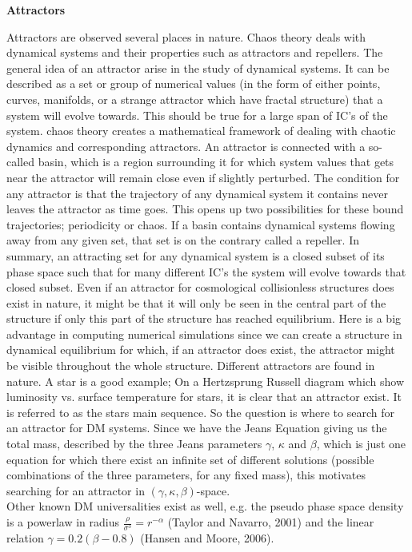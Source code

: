 \centerline{\textbf{Attractors}} 
Attractors are observed several places in nature. Chaos theory deals with dynamical systems and their properties such as attractors and repellers. The general idea of an attractor arise in the study of dynamical systems. It can be described as a set or group of numerical values (in the form of either points, curves, manifolds, or a strange attractor which have fractal structure) that a system will evolve towards. This should be true for a large span of IC's of the system. 
chaos theory creates a mathematical framework of dealing with chaotic dynamics and corresponding attractors. An attractor is connected with a so-called basin, which is a region surrounding it for which system values that gets near the attractor will remain close even if slightly perturbed. The condition for any attractor is that the trajectory of any dynamical system it contains never leaves the attractor as time goes. This opens up two possibilities for these bound trajectories; periodicity or chaos. If a basin contains dynamical systems flowing away from any given set, that set is on the contrary called a repeller. In summary, an attracting set for any dynamical system is a closed subset of its phase space such that for many different IC's the system will evolve towards that closed subset. Even if an attractor for cosmological collisionless structures does exist in nature, it might be that it will only be seen in the central part of the structure if only this part of the structure has reached equilibrium. Here is a big advantage in computing numerical simulations since we can create a structure in dynamical equilibrium for which, if an attractor does exist, the attractor might be visible throughout the whole structure. Different attractors are found in nature. A star is a good example; On a Hertzsprung Russell diagram which show luminosity vs. surface temperature for stars, it is clear that an attractor exist. It is referred to as the stars main sequence. So the question is where to search for an attractor for DM systems. Since we have the Jeans Equation giving us the total mass, described by the three Jeans parameters $ \gamma$, $\kappa$ and $\beta$, which is just one equation for which there exist an infinite set of different solutions (possible combinations of the three parameters, for any fixed mass), this motivates searching for an attractor in $ (\gamma, \kappa, \beta) $-space. \\
Other known DM universalities exist as well, e.g. the pseudo phase space density is a powerlaw in radius $\frac{\rho}{\sigma^3}=r^{-\alpha}$ (Taylor and Navarro, 2001) and the linear relation $\gamma = 0.2(\beta - 0.8)$ (Hansen and Moore, 2006).

